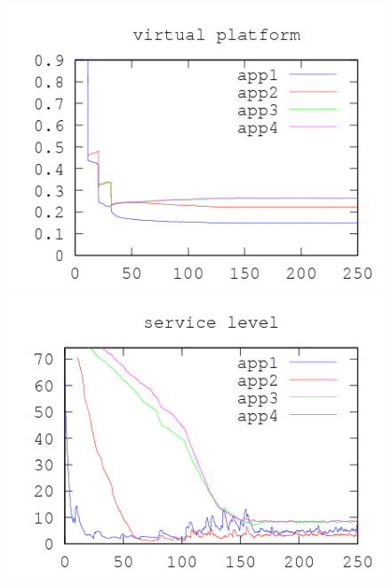 \documentclass[nobiblatex]{LTHthesis}
\begin{document}
\begin{figure}[th]
\centering
  \begin{minipage}{0.49\textwidth}
  \centering
  \includegraphics[width=\textwidth]{"tools/plot/logs/test1/vp"}
  \end{minipage}
  \hfill
  \begin{minipage}{0.49\textwidth}
  \centering
  \includegraphics[width=\textwidth]{"tools/plot/logs/test1/sl"}
  \end{minipage}
  \begin{minipage}{0.49\textwidth}
  \centering

\end{minipage}
\end{figure}
\end{document}
